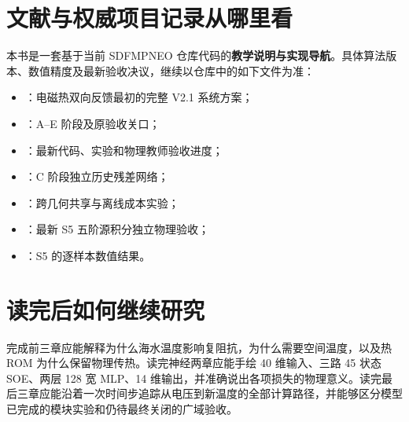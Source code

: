 \section{文献与权威项目记录从哪里看}
本书是一套基于当前 SDFMPNEO 仓库代码的\textbf{教学说明与实现导航}。具体算法版本、数值精度及最新验收决议，继续以仓库中的如下文件为准：
\begin{itemize}
\item {}：电磁热双向反馈最初的完整 V2.1 系统方案；
\item {}：A--E 阶段及原验收关口；
\item {}：最新代码、实验和物理教师验收进度；
\item {}：C 阶段独立历史残差网络；
\item {}：跨几何共享与离线成本实验；
\item {}：最新 S5 五阶源积分独立物理验收；
\item {}：S5 的逐样本数值结果。
\end{itemize}

\section{读完后如何继续研究}
完成前三章应能解释为什么海水温度影响复阻抗，为什么需要空间温度，以及热 ROM 为什么保留物理传热。读完神经两章应能手绘 40 维输入、三路 45 状态 SOE、两层 128 宽 MLP、14 维输出，并准确说出各项损失的物理意义。读完最后三章应能沿着一次时间步追踪从电压到新温度的全部计算路径，并能够区分模型已完成的模块实验和仍待最终关闭的广域验收。
